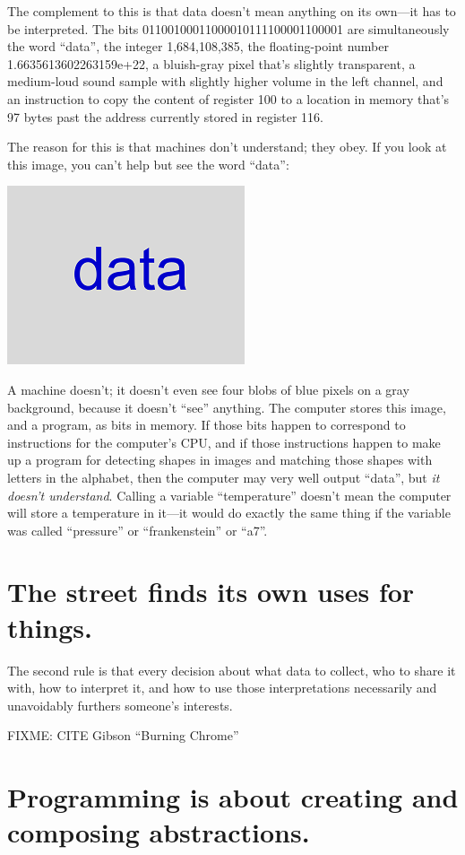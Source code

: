 \documentclass[10pt,letterpaper]{article}
\newcommand{\rulemajor}[1]{\section{#1}}
\begin{document}
The complement to this is that data doesn't mean anything on its own---it has to
be interpreted.  The bits 01100100011000010111100001100001 are simultaneously
the word ``data'', the integer 1,684,108,385, the floating-point number
1.6635613602263159e+22, a bluish-gray pixel that's slightly transparent, a
medium-loud sound sample with slightly higher volume in the left channel, and an
instruction to copy the content of register 100 to a location in memory that's
97 bytes past the address currently stored in register 116.

The reason for this is that machines don't understand; they obey.  If you look
at this image, you can't help but see the word ``data'':

\includegraphics{data.png}

A machine doesn't; it doesn't even see four blobs of blue pixels on a gray
background, because it doesn't ``see'' anything.  The computer stores this
image, and a program, as bits in memory.  If those bits happen to correspond to
instructions for the computer's CPU, and if those instructions happen to make up
a program for detecting shapes in images and matching those shapes with letters
in the alphabet, then the computer may very well output ``data'', but \emph{it
  doesn't understand}.  Calling a variable ``temperature'' doesn't mean the
computer will store a temperature in it---it would do exactly the same thing if
the variable was called ``pressure'' or ``frankenstein'' or ``a7''.

\rulemajor{The street finds its own uses for things.}

The second rule is that every decision about what data to collect, who to share
it with, how to interpret it, and how to use those interpretations necessarily
and unavoidably furthers someone's interests.

FIXME: CITE Gibson ``Burning Chrome''

\rulemajor{Programming is about creating and composing abstractions.}
\end{document}
